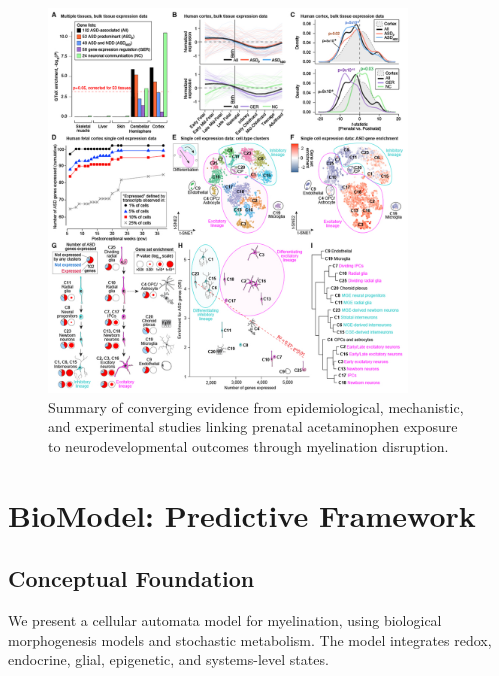 \documentclass[12pt]{article}
\begin{document}
\begin{figure}[h]
\centering
\includegraphics[width=0.85\textwidth]{../assets/nihms-1569306-f0005.jpg}
\caption{Summary of converging evidence from epidemiological, mechanistic, and experimental studies linking prenatal acetaminophen exposure to neurodevelopmental outcomes through myelination disruption.}
\label{fig:evidence-summary}
\end{figure}

\section{BioModel: Predictive Framework}

\subsection{Conceptual Foundation}
We present a cellular automata model for myelination, using biological morphogenesis models and stochastic metabolism. The model integrates redox, endocrine, glial, epigenetic, and systems-level states.

\end{document}
